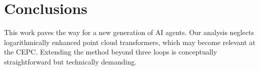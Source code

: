 \section{Conclusions}\label{sec:conclusions}

This work paves the way for a new generation of AI agents. Our analysis
neglects logarithmically enhanced point cloud transformers, which may
become relevant at the CEPC. Extending the method beyond three loops is
conceptually straightforward but technically demanding.

